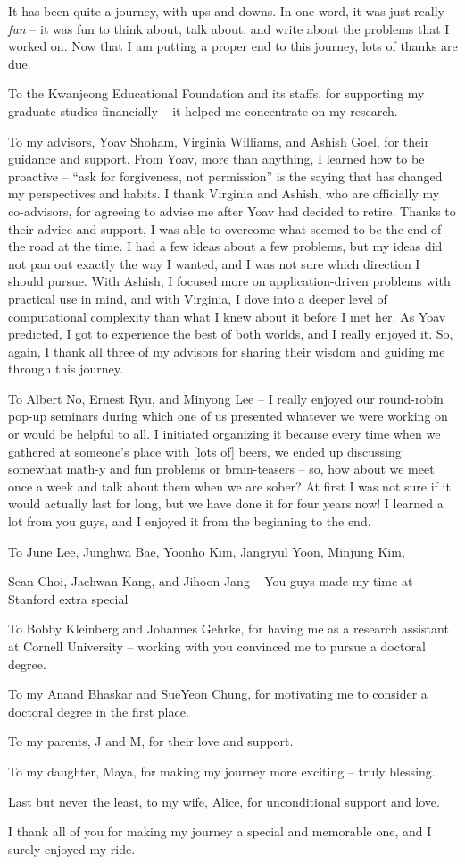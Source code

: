 It has been quite a journey, with ups and downs.
In one word, it was just really {\em fun} -- it was fun to think about, talk about, and write about the problems that I worked on. 
Now that I am putting a proper end to this journey, lots of thanks are due. 

To the Kwanjeong Educational Foundation and its staffs, for supporting my graduate studies financially -- it helped me concentrate on my research.

To my advisors, Yoav Shoham, Virginia Williams, and Ashish Goel, for their guidance and support. From Yoav, more than anything, I learned how to be proactive -- ``ask for forgiveness, not permission'' is the saying that has changed my perspectives and habits. I thank Virginia and Ashish, who are officially my co-advisors, for agreeing to advise me after Yoav had decided to retire. Thanks to their advice and support, I was able to overcome what seemed to be the end of the road at the time. I had a few ideas about a few problems, but my ideas did not pan out exactly the way I wanted, and I was not sure which direction I should pursue. With Ashish, I focused more on application-driven problems with practical use in mind, and with Virginia, I dove into a deeper level of computational complexity than what I knew about it before I met her. As Yoav predicted, I got to experience the best of both worlds, and I really enjoyed it. So, again, I thank all three of my advisors for sharing their wisdom and guiding me through this journey.

To Albert No, Ernest Ryu, and Minyong Lee -- I really enjoyed our round-robin pop-up seminars during which one of us presented whatever we were working on or would be helpful to all. I initiated organizing it because every time when we gathered at someone's place with [lots of] beers, we ended up discussing somewhat math-y and fun problems or brain-teasers -- so, how about we meet once a week and talk about them when we are sober? At first I was not sure if it would actually last for long, but we have done it for four years now! I learned a lot from you guys, and I enjoyed it from the beginning to the end. 

To June Lee, Junghwa Bae, Yoonho Kim, Jangryul Yoon, Minjung Kim, 

Sean Choi, Jaehwan Kang, and Jihoon Jang -- You guys made my time at Stanford extra special  


To Bobby Kleinberg and Johannes Gehrke, for having me as a research assistant at Cornell University -- working with you convinced me to pursue a doctoral degree.

To my Anand Bhaskar and SueYeon Chung, for motivating me to consider a doctoral degree in the first place.

To my parents, J and M, for their love and support.

To my daughter, Maya, for making my journey more exciting -- truly blessing.

Last but never the least, to my wife, Alice, for unconditional support and love.

I thank all of you for making my journey a special and memorable one, and I surely enjoyed my ride.


